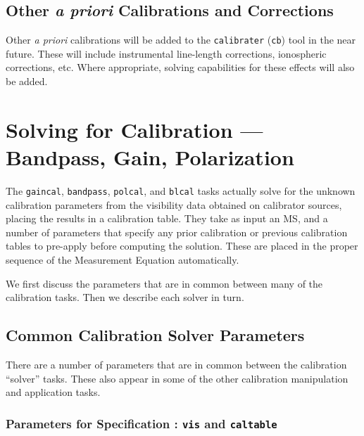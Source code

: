 \subsection{Other {\it a priori} Calibrations and Corrections}
\label{section:cal.prior.other}

Other {\it a priori} calibrations will be added to the 
{\tt calibrater} ({\tt cb}) tool 
in the near future.  These will include
instrumental line-length corrections, ionospheric corrections, etc.  Where
appropriate, solving capabilities for these effects will also be
added.

\section{Solving for Calibration --- Bandpass, Gain, Polarization}
\label{section:cal.solve}

The {\tt gaincal}, {\tt bandpass}, {\tt polcal}, and {\tt blcal}
tasks actually solve for the unknown calibration parameters from the
visibility data obtained on calibrator sources,
placing the results in a calibration table.  They take as input
an MS, and a number of parameters that specify any prior calibration
or previous calibration tables to pre-apply before computing the
solution.  These are placed in the proper sequence of the Measurement
Equation automatically.

We first discuss the parameters that are in common between many
of the calibration tasks.  Then we describe each solver in turn.

\subsection{Common Calibration Solver Parameters}
\label{section:cal.solve.pars}

There are a number of parameters that are in common between 
the calibration ``solver'' tasks.  These also appear in some
of the other calibration manipulation and application tasks.

\subsubsection{Parameters for Specification : {\tt vis} and
{\tt caltable} }
\label{section:cal.solve.pars.spec}

